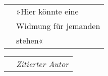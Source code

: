 
\cleardoublepage

  ~
  \vspace{370pt} %

  \begin{tabularx}{0.9\textwidth}{Xl}
      & {\large »Hier könnte eine} \\
      & {\large Widmung für jemanden} \\
      & {\large stehen«} \\
  \end{tabularx}

  \vspace{0pt}

  \begin{tabularx}{0.9\textwidth}{Xr}
      & \textit{Zitierter Autor}\\
  \end{tabularx}

\cleardoublepage
